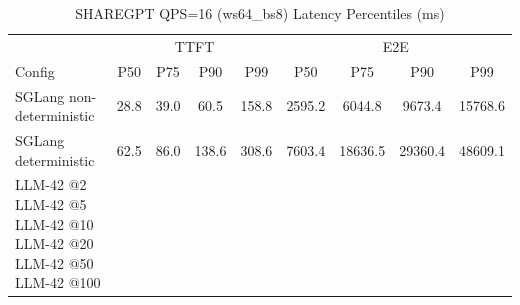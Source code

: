 \begin{table}[htbp]
\centering
\caption{SHAREGPT QPS=16 (ws64_bs8) Latency Percentiles (ms)}
\label{tab:sharegpt_qps16_ws64_bs8}
\begin{tabular}{l|cccc|cccc}
\toprule
& \multicolumn{4}{c|}{TTFT} & \multicolumn{4}{c}{E2E} \\
Config & P50 & P75 & P90 & P99 & P50 & P75 & P90 & P99 \\
\midrule
SGLang non-deterministic & 28.8 & 39.0 & 60.5 & 158.8 & 2595.2 & 6044.8 & 9673.4 & 15768.6 \\
SGLang deterministic & 62.5 & 86.0 & 138.6 & 308.6 & 7603.4 & 18636.5 & 29360.4 & 48609.1 \\
LLM-42 @2%
LLM-42 @5%
LLM-42 @10%
LLM-42 @20%
LLM-42 @50%
LLM-42 @100%
\bottomrule
\end{tabular}
\end{table}
